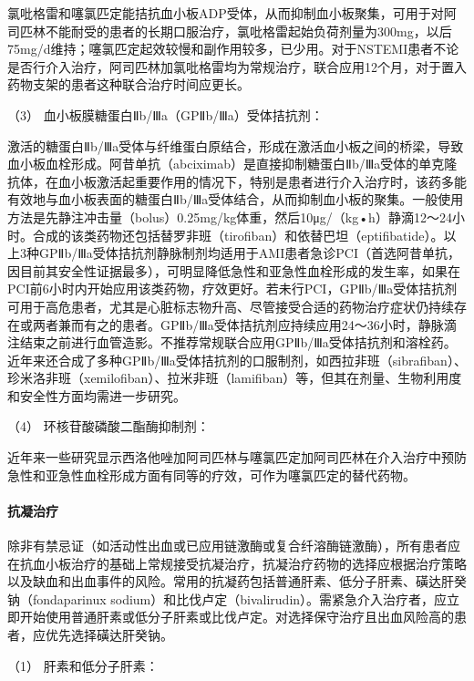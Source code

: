 氯吡格雷和噻氯匹定能拮抗血小板ADP受体，从而抑制血小板聚集，可用于对阿司匹林不能耐受的患者的长期口服治疗，氯吡格雷起始负荷剂量为300mg，以后75mg/d维持；噻氯匹定起效较慢和副作用较多，已少用。对于NSTEMI患者不论是否行介入治疗，阿司匹林加氯吡格雷均为常规治疗，联合应用12个月，对于置入药物支架的患者这种联合治疗时间应更长。

\hypertarget{text00312.htmlux5cux23CHP10-8-2-3-2-1-3}{}
（3） 血小板膜糖蛋白Ⅱb/Ⅲa（GPⅡb/Ⅲa）受体拮抗剂：

激活的糖蛋白Ⅱb/Ⅲa受体与纤维蛋白原结合，形成在激活血小板之间的桥梁，导致血小板血栓形成。阿昔单抗（abciximab）是直接抑制糖蛋白Ⅱb/Ⅲa受体的单克隆抗体，在血小板激活起重要作用的情况下，特别是患者进行介入治疗时，该药多能有效地与血小板表面的糖蛋白Ⅱb/Ⅲa受体结合，从而抑制血小板的聚集。一般使用方法是先静注冲击量（bolus）0.25mg/kg体重，然后10μg/（kg•h）静滴12～24小时。合成的该类药物还包括替罗非班（tirofiban）和依替巴坦（eptifibatide）。以上3种GPⅡb/Ⅲa受体拮抗剂静脉制剂均适用于AMI患者急诊PCI（首选阿昔单抗，因目前其安全性证据最多），可明显降低急性和亚急性血栓形成的发生率，如果在PCI前6小时内开始应用该类药物，疗效更好。若未行PCI，GPⅡb/Ⅲa受体拮抗剂可用于高危患者，尤其是心脏标志物升高、尽管接受合适的药物治疗症状仍持续存在或两者兼而有之的患者。GPⅡb/Ⅲa受体拮抗剂应持续应用24～36小时，静脉滴注结束之前进行血管造影。不推荐常规联合应用GPⅡb/Ⅲa受体拮抗剂和溶栓药。近年来还合成了多种GPⅡb/Ⅲa受体拮抗剂的口服制剂，如西拉非班（sibrafiban）、珍米洛非班（xemilofiban）、拉米非班（lamifiban）等，但其在剂量、生物利用度和安全性方面均需进一步研究。

\hypertarget{text00312.htmlux5cux23CHP10-8-2-3-2-1-4}{}
（4） 环核苷酸磷酸二酯酶抑制剂：

近年来一些研究显示西洛他唑加阿司匹林与噻氯匹定加阿司匹林在介入治疗中预防急性和亚急性血栓形成方面有同等的疗效，可作为噻氯匹定的替代药物。

\paragraph{抗凝治疗}

除非有禁忌证（如活动性出血或已应用链激酶或复合纤溶酶链激酶），所有患者应在抗血小板治疗的基础上常规接受抗凝治疗，抗凝治疗药物的选择应根据治疗策略以及缺血和出血事件的风险。常用的抗凝药包括普通肝素、低分子肝素、磺达肝癸钠（fondaparinux
sodium）和比伐卢定（bivalirudin）。需紧急介入治疗者，应立即开始使用普通肝素或低分子肝素或比伐卢定。对选择保守治疗且出血风险高的患者，应优先选择磺达肝癸钠。

\hypertarget{text00312.htmlux5cux23CHP10-8-2-3-2-2-1}{}
（1） 肝素和低分子肝素：


